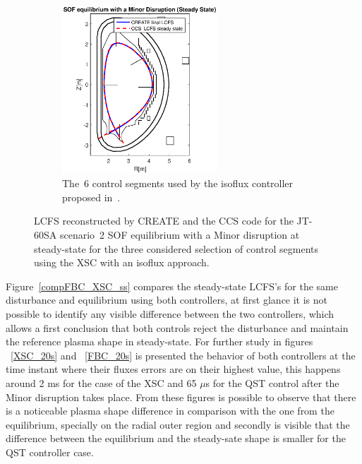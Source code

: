 \begin{figure}[h]
\begin{subfigure}[b]{0.32\textwidth}
	\end{subfigure}
	~
	\begin{subfigure}[b]{0.32\textwidth}
		\includegraphics [trim={2.3cm 0cm 2.3cm 0.8cm},clip,height=6.30cm]  {Chp3/6_gaps_mnr_disrp_SS_comp.eps} 
		\caption{  The~6 control segments used by the isoflux controller proposed in~\cite{Miyata:2014}.    \label{6gaps_isoflux}}
	\end{subfigure}

\caption{LCFS reconstructed by CREATE and the CCS code  for the JT-60SA scenario~2 SOF equilibrium with a Minor disruption at steady-state for the three considered selection of control segments using the XSC with an isoflux approach.}\label{all_points}

\end{figure}

Figure~\ref{compFBC_XSC_ss} compares the steady-state LCFS's for the same disturbance and equilibrium using both controllers, at first glance it is not possible to identify any visible difference between the two controllers, which allows a first conclusion that both controls reject the disturbance and maintain the reference plasma shape in steady-state. For further study in figures ~\ref{XSC_20s} and  ~\ref{FBC_20s} is presented the behavior of both controllers at the time instant where their fluxes errors are on their highest value, this happens around 2 ms for the case of the XSC and 65 $\mu$s for the QST control after the Minor disruption takes place. From these figures is possible to  observe that there is a noticeable plasma shape difference in comparison with the one from the equilibrium, specially   on the radial outer region and secondly is visible that the difference between the equilibrium and the steady-sate shape  is smaller for the QST controller case.     
\smallskip

